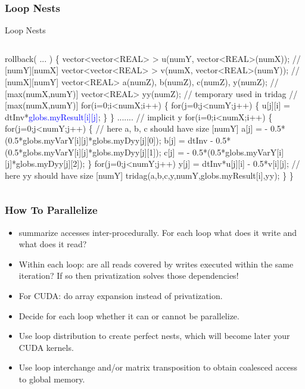 \documentclass{beamer}
\newcommand{\blue}[1]{\textcolor{Blue}{{#1}}}
\begin{document}
\begin{frame}[fragile,t]
  \frametitle{Loop Nests} %

\begin{block}{Loop Nests}
\begin{columns}
\begin{colorcode}
rollback( ... ) \{
  vector<vector<REAL> > u(numY, vector<REAL>(numX));   // [numY][numX]
  vector<vector<REAL> > v(numX, vector<REAL>(numY));   // [numX][numY]
  vector<REAL> a(numZ), b(numZ), c(numZ), y(numZ);     // [max(numX,numY)] 
  vector<REAL> yy(numZ);  // temporary used in tridag  // [max(numX,numY)]
  for(i=0;i<numX;i++) \{
    for(j=0;j<numY;j++) \{
      u[j][i] = dtInv*\blue{globs.\alert{myResult[i][j]}};
  \} \}  .......
  // implicit y
  for(i=0;i<numX;i++) \{ 
    for(j=0;j<numY;j++) \{  // here a, b, c should have size [numY]
      a[j] =		 - 0.5*(0.5*globs.myVarY[i][j]*globs.myDyy[j][0]);
      b[j] = dtInv - 0.5*(0.5*globs.myVarY[i][j]*globs.myDyy[j][1]);
      c[j] =		 - 0.5*(0.5*globs.myVarY[i][j]*globs.myDyy[j][2]);
    \}
    for(j=0;j<numY;j++)
      y[j] = dtInv*u[j][i] - 0.5*v[i][j];
    // here yy should have size [numY]
    tridag(a,b,c,y,numY,globs.\alert{myResult[i]},yy);
  \} \}
\end{colorcode}
\end{columns}
\end{block} 

\end{frame}


\begin{frame}[fragile,t]
  \frametitle{How To Parallelize} %

\begin{itemize}
    \item summarize accesses inter-procedurally. 
            For each loop what does it write and what does it read?\medskip
    \item Within each loop: are all reads covered by writes
            executed within the same iteration?
            If so then privatization solves those dependencies!\medskip
    \item For CUDA: do array expansion instead of privatization.\medskip
    \item Decide for each loop whether it can or cannot be parallelize.\medskip
    \item Use loop distribution to create perfect nests,
            which will become later your CUDA kernels.\medskip
    \item Use loop interchange and/or matrix transposition
            to obtain coalesced access to global memory.
\end{itemize}
\end{frame}
\end{document}
